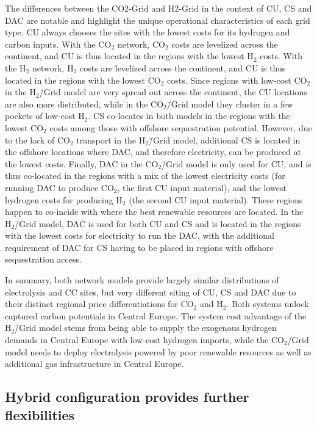 \documentclass[twocolumn]{article}
\newcommand{\COtwo}{CO$_2$}
\newcommand{\Htwo}{H$_2$}
\newcommand{\modCO}{CO$_2$\=/Grid model}
\newcommand{\modH}{H$_2$\=/Grid model}
\begin{document}
The differences between the CO2-Grid and H2-Grid in the context of CU, CS and DAC are notable and highlight the unique operational characteristics of each grid type.
CU always chooses the sites with the lowest costs for its hydrogen and carbon inputs. With the \COtwo{} network, \COtwo{} costs are levelized across the continent, and CU is thus located in the regions with the lowest \Htwo{} costs. With the \Htwo{} network, \Htwo{} costs are levelized across the continent, and CU is thus located in the regions with the lowest \COtwo{} costs. Since regions with low-cost \COtwo{} in the \modH{} are very spread out across the continent, the CU locations are also more distributed, while in the \modCO{} they cluster in a few pockets of low-cost \Htwo{}.
CS co-locates in both models in the regions with the lowest \COtwo{} costs among those with offshore sequestration potential. However, due to the lack of \COtwo{} transport in the \modH{}, additional CS is located in the offshore locations where DAC, and therefore electricity, can be produced at the lowest costs.
Finally, DAC in the \modCO{} is only used for CU, and is thus co-located in the regions with a mix of the lowest electricity costs (for running DAC to produce \COtwo{}, the first CU input material), and the lowest hydrogen costs for producing \Htwo{} (the second CU input material). These regions happen to co-incide with where the best renewable resources are located. In the \modH{}, DAC is used for both CU and CS and is located in the regions with the lowest costs for electricity to run the DAC, with the additional requirement of DAC for CS having to be placed in regions with offshore sequestration access.

In summary, both network models provide largely similar distributions of electrolysis and CC sites, but very different siting of CU, CS and DAC due to their distinct regional price differentiations for \COtwo{} and \Htwo{}. Both systems unlock captured carbon potentials in Central Europe. The system cost advantage of the \modH{} stems from being able to supply the exogenous hydrogen demands in Central Europe with low-cost hydrogen imports, while the \modCO{} needs to deploy electrolysis powered by poor renewable resources as well as additional gas infrastructure in Central Europe.


\subsection*{Hybrid configuration provides further flexibilities}\label{subsec:Hybrid}
\end{document}

